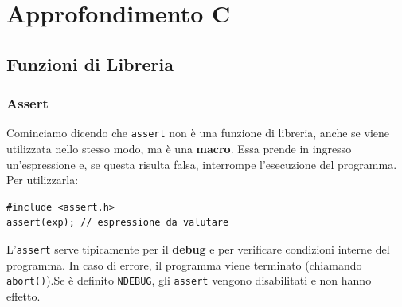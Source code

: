 \chapter{Approfondimento C}
\section{Funzioni di Libreria}
\subsection{Assert}
Cominciamo dicendo che \texttt{assert} non è una funzione di libreria,
anche se viene utilizzata nello stesso modo, ma è una \textbf{macro}. 
Essa prende in ingresso un'espressione e, se questa risulta falsa,
interrompe l'esecuzione del programma. Per utilizzarla:
\begin{verbatim}
#include <assert.h>
assert(exp); // espressione da valutare
\end{verbatim}
L'\texttt{assert} serve tipicamente per il \textbf{debug} e per verificare condizioni
interne del programma. In caso di errore, il programma viene terminato
(chiamando \texttt{abort()}).Se è definito \texttt{NDEBUG}, gli \texttt{assert} 
vengono disabilitati e non hanno effetto.
